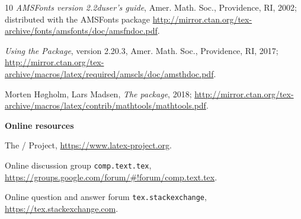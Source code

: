 \documentclass[leqno,titlepage,openany]{amsldoc}[1999/12/13]
\newcommand{\booktitle}[1]{\textit{#1}}
\newif\iffirstbibsubhead \firstbibsubheadtrue
\newcommand{\bibsubhead}[1]{%
  \iffirstbibsubhead \firstbibsubheadfalse
  \else \addvspace{\medskipamount}
  \fi
  \item[]\hspace*{-\leftmargin}\textbf{#1}\par
  \vspace{\smallskipamount}
}
\begin{document}
\begin{thebibliography}{10}
\booktitle{AMSFonts version \textup{2.2d}\mdash user's guide},
Amer. Math. Soc., Providence, RI, 2002; distributed
with the AMSFonts package
\url{http://mirror.ctan.org/tex-archive/fonts/amsfonts/doc/amsfndoc.pdf}.

\booktitle{Using the  Package}, version 2.20.3,
Amer. Math. Soc., Providence, RI, 2017;
\url{http://mirror.ctan.org/tex-archive/macros/latex/required/amscls/doc/amsthdoc.pdf}.

 Morten H{\o}gholm, Lars Madsen, \booktitle{The 
package}, 2018;
\url{http://mirror.ctan.org/tex-archive/macros/latex/contrib/mathtools/mathtools.pdf}.

\bibsubhead{Online resources}

 The \latex/ Project, \url{https://www.latex-project.org}.

 Online discussion group \texttt{comp.text.tex},
\url{https://groups.google.com/forum/\#!forum/comp.text.tex}.

 Online question and answer forum \texttt{tex.stackexchange},
\url{https://tex.stackexchange.com}.

\end{thebibliography}

\printindex
\end{document}
